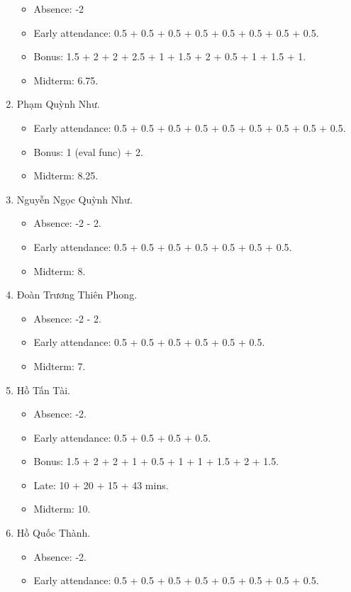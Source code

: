 \documentclass{article}
\begin{document}
\begin{enumerate}
	\begin{itemize}
		\item Absence: -2
		\item Early attendance: 0.5 + 0.5 + 0.5 + 0.5 + 0.5 + 0.5 + 0.5 + 0.5.
		\item Bonus: 1.5 + 2 + 2 + 2.5 + 1 + 1.5 + 2 + 0.5 + 1 + 1.5 + 1.
        \item Midterm: 6.75.
	\end{itemize}
	\item {\sc Phạm Quỳnh Như.}
	\begin{itemize}
		\item Early attendance: 0.5 + 0.5 + 0.5 + 0.5 + 0.5 + 0.5 + 0.5 + 0.5 + 0.5.
		\item Bonus: 1 (eval func) + 2.
        \item Midterm: 8.25.
	\end{itemize}
	\item {\sc Nguyễn Ngọc Quỳnh Như.}
	\begin{itemize}
        \item Absence: -2 - 2.
		\item Early attendance: 0.5 + 0.5 + 0.5 + 0.5 + 0.5 + 0.5 + 0.5.
        \item Midterm: 8.
	\end{itemize}
	\item {\sc Đoàn Trương Thiên Phong.}
	\begin{itemize}
		\item Absence: -2 - 2.
		\item Early attendance: 0.5 + 0.5 + 0.5 + 0.5 + 0.5 + 0.5.
        \item Midterm: 7.
	\end{itemize}
	\item {\sc Hồ Tấn Tài.}
	\begin{itemize}
        \item Absence: -2.
		\item Early attendance: 0.5 + 0.5 + 0.5 + 0.5.
		\item Bonus: 1.5 + 2 + 2 + 1 + 0.5 + 1 + 1 + 1.5 + 2 + 1.5.
		\item Late: 10 + 20 + 15 + 43 mins.
        \item Midterm: 10.
	\end{itemize}
	\item {\sc Hồ Quốc Thành.}
	\begin{itemize}
        \item Absence: -2.
		\item Early attendance: 0.5 + 0.5 + 0.5 + 0.5 + 0.5 + 0.5 + 0.5 + 0.5.

\end{itemize}
\end{enumerate}
\end{document}
